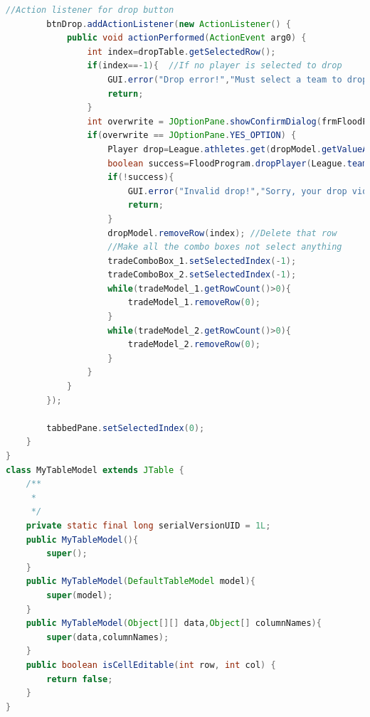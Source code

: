 \documentclass[12pt]{report}
\begin{document}
\begin{singlespace}
\begin{lstlisting}[language=Java,label=some-code,caption={GUI.java}]
		//Action listener for drop button
		btnDrop.addActionListener(new ActionListener() {
			public void actionPerformed(ActionEvent arg0) {
				int index=dropTable.getSelectedRow();
				if(index==-1){	//If no player is selected to drop
					GUI.error("Drop error!","Must select a team to drop a player from.");
					return;
				}
				int overwrite = JOptionPane.showConfirmDialog(frmFloodFantasyLeague, "Are you sure you want to drop: " + League.athletes.get(dropModel.getValueAt(index,0)).getName());
                if(overwrite == JOptionPane.YES_OPTION) {
					Player drop=League.athletes.get(dropModel.getValueAt(index,0));	//Get player
					boolean success=FloodProgram.dropPlayer(League.teams.get(dropComboBox.getSelectedItem()),drop);	//Determine if drop is successful
					if(!success){
						GUI.error("Invalid drop!","Sorry, your drop violates rules of the league.");
						return;
					}
					dropModel.removeRow(index);	//Delete that row
					//Make all the combo boxes not select anything
					tradeComboBox_1.setSelectedIndex(-1);
					tradeComboBox_2.setSelectedIndex(-1);
					while(tradeModel_1.getRowCount()>0){
						tradeModel_1.removeRow(0);
					}
					while(tradeModel_2.getRowCount()>0){
						tradeModel_2.removeRow(0);
					}
                }
			}
		});
		
		tabbedPane.setSelectedIndex(0);
	}
}
class MyTableModel extends JTable {
	/**
	 * 
	 */
	private static final long serialVersionUID = 1L;
	public MyTableModel(){
		super();
	}
	public MyTableModel(DefaultTableModel model){
		super(model);
	}
	public MyTableModel(Object[][] data,Object[] columnNames){
		super(data,columnNames);
	}
    public boolean isCellEditable(int row, int col) {
    	return false;
    }
}
\end{lstlisting}
\end{singlespace}
\end{document}
